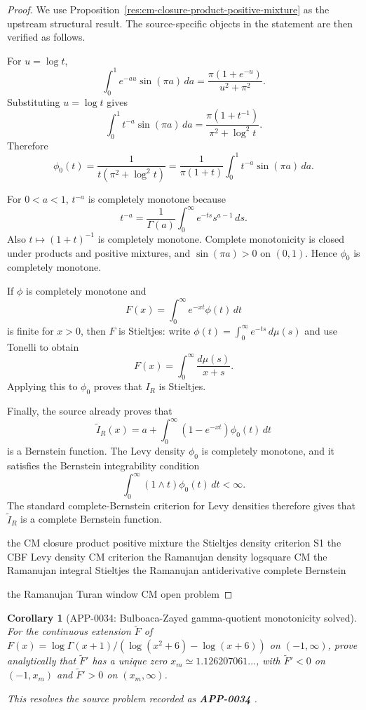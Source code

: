 \documentclass[11pt]{article}
\numberwithin{equation}{section}
\newtheorem{corollary}[theorem]{Corollary}
\theoremstyle{definition}
\theoremstyle{remark}
\newcommand{\1}{\mathbf 1}
\begin{document}
\begin{proof}
We use Proposition~\ref{res:cm-closure-product-positive-mixture} as the upstream structural result. The source-specific objects in the statement are then verified as follows.

For \(u=\log t\),
\[
\int_0^1 e^{-au}\sin(\pi a)\,da
=\frac{\pi(1+e^{-u})}{u^2+\pi^2}.
\]
Substituting \(u=\log t\) gives
\[
\int_0^1 t^{-a}\sin(\pi a)\,da
=\frac{\pi(1+t^{-1})}{\pi^2+\log^2 t}.
\]
Therefore
\[
\phi_0(t)
=\frac{1}{t(\pi^2+\log^2 t)}
=\frac{1}{\pi(1+t)}\int_0^1 t^{-a}\sin(\pi a)\,da.
\]

For \(0<a<1\), \(t^{-a}\) is completely monotone because
\[
t^{-a}=\frac1{\Gamma(a)}\int_0^\infty e^{-ts}s^{a-1}\,ds.
\]
Also \(t\mapsto(1+t)^{-1}\) is completely monotone. Complete monotonicity is closed under products and positive mixtures, and \(\sin(\pi a)>0\) on \((0,1)\). Hence \(\phi_0\) is completely monotone.

If \(\phi\) is completely monotone and
\[
F(x)=\int_0^\infty e^{-xt}\phi(t)\,dt
\]
is finite for \(x>0\), then \(F\) is Stieltjes: write \(\phi(t)=\int_0^\infty e^{-ts}\,d\mu(s)\) and use Tonelli to obtain
\[
F(x)=\int_0^\infty\frac{d\mu(s)}{x+s}.
\]
Applying this to \(\phi_0\) proves that \(I_R\) is Stieltjes.

Finally, the source already proves that
\[
\widetilde I_R(x)=a+\int_0^\infty (1-e^{-xt})\phi_0(t)\,dt
\]
is a Bernstein function. The Levy density \(\phi_0\) is completely monotone, and it satisfies the Bernstein integrability condition
\[
\int_0^\infty (1\wedge t)\phi_0(t)\,dt<\infty.
\]
The standard complete-Bernstein criterion for Levy densities therefore gives that \(\widetilde I_R\) is a complete Bernstein function.

the CM closure product positive mixture
the Stieltjes density criterion S1
the CBF Levy density CM criterion
the Ramanujan density logsquare CM
the Ramanujan integral Stieltjes
the Ramanujan antiderivative complete Bernstein

the Ramanujan Turan window CM open problem
\end{proof}

\begin{corollary}[APP-0034: Bulboaca-Zayed gamma-quotient monotonicity solved]
\label{res:bulboaca-zayed-gamma-quotient-full-monotonicity}
For the continuous extension \(\widetilde F\) of \(F(x)=\log\Gamma(x+1)/(\log(x^2+6)-\log(x+6))\) on \((-1,\infty)\), prove analytically that \(\widetilde F'\) has a unique zero \(x_m\simeq1.126207061\ldots\), with \(\widetilde F'<0\) on \((-1,x_m)\) and \(\widetilde F'>0\) on \((x_m,\infty)\).



This resolves the source problem recorded as \textbf{APP-0034} \cite{bulboaca-zayed-gamma}.
\end{corollary}
\end{document}

